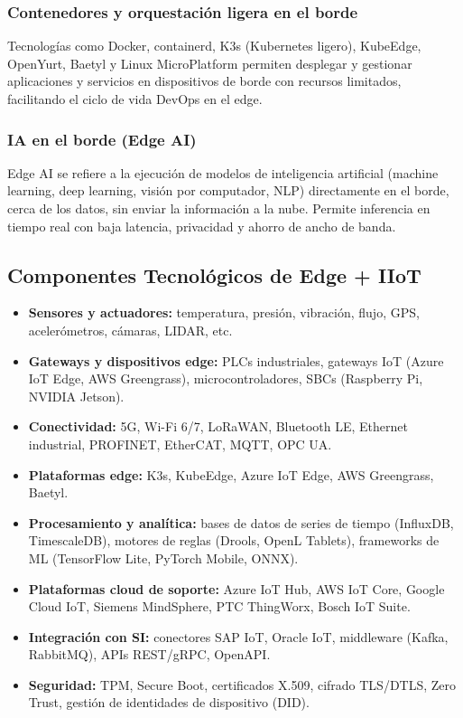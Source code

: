 ﻿\documentclass[12pt,a4paper,oneside]{article}
\begin{document}
\subsubsection{Contenedores y orquestación ligera en el borde}

Tecnologías como Docker, containerd, K3s (Kubernetes ligero), KubeEdge, OpenYurt, Baetyl y Linux MicroPlatform permiten desplegar y gestionar aplicaciones y servicios en dispositivos de borde con recursos limitados, facilitando el ciclo de vida DevOps en el edge.

\subsubsection{IA en el borde (Edge AI)}

Edge AI se refiere a la ejecución de modelos de inteligencia artificial (machine learning, deep learning, visión por computador, NLP) directamente en el borde, cerca de los datos, sin enviar la información a la nube. Permite inferencia en tiempo real con baja latencia, privacidad y ahorro de ancho de banda.

\subsection{Componentes Tecnológicos de Edge + IIoT}

\begin{itemize}[leftmargin=*]
    \item \textbf{Sensores y actuadores:} temperatura, presión, vibración, flujo, GPS, acelerómetros, cámaras, LIDAR, etc.
    \item \textbf{Gateways y dispositivos edge:} PLCs industriales, gateways IoT (Azure IoT Edge, AWS Greengrass), microcontroladores, SBCs (Raspberry Pi, NVIDIA Jetson).
    \item \textbf{Conectividad:} 5G, Wi-Fi 6/7, LoRaWAN, Bluetooth LE, Ethernet industrial, PROFINET, EtherCAT, MQTT, OPC UA.
    \item \textbf{Plataformas edge:} K3s, KubeEdge, Azure IoT Edge, AWS Greengrass, Baetyl.
    \item \textbf{Procesamiento y analítica:} bases de datos de series de tiempo (InfluxDB, TimescaleDB), motores de reglas (Drools, OpenL Tablets), frameworks de ML (TensorFlow Lite, PyTorch Mobile, ONNX).
    \item \textbf{Plataformas cloud de soporte:} Azure IoT Hub, AWS IoT Core, Google Cloud IoT, Siemens MindSphere, PTC ThingWorx, Bosch IoT Suite.
    \item \textbf{Integración con SI:} conectores SAP IoT, Oracle IoT, middleware (Kafka, RabbitMQ), APIs REST/gRPC, OpenAPI.
    \item \textbf{Seguridad:} TPM, Secure Boot, certificados X.509, cifrado TLS/DTLS, Zero Trust, gestión de identidades de dispositivo (DID).
\end{itemize}
\end{document}
